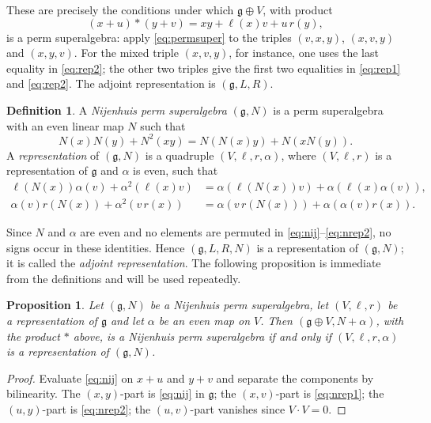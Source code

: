 \documentclass[11pt]{article}
\newtheorem{proposition}[theorem]{Proposition}
\theoremstyle{definition}
\newtheorem{definition}[theorem]{Definition}
\newcommand{\g}{\mathfrak{g}}
\begin{document}
These are precisely the conditions under which $\g\oplus V$, with product
\[
(x+u)*(y+v)=xy+\ell(x)v+u\,r(y),
\]
is a perm superalgebra: apply \eqref{eq:permsuper} to the triples $(v,x,y)$, $(x,v,y)$ and $(x,y,v)$. For the mixed triple $(x,v,y)$, for instance, one uses the last equality in \eqref{eq:rep2}; the other two triples give the first two equalities in \eqref{eq:rep1} and \eqref{eq:rep2}. The adjoint representation is $(\g,L,R)$.

\begin{definition}\label{def:nijenhuis}
A \emph{Nijenhuis perm superalgebra} $(\g,N)$ is a perm superalgebra with an even linear map $N$ such that
\begin{equation}\label{eq:nij}
N(x)N(y)+N^2(xy)=N(N(x)y)+N(xN(y)).
\end{equation}
A \emph{representation} of $(\g,N)$ is a quadruple $(V,\ell,r,\alpha)$, where $(V,\ell,r)$ is a representation of $\g$ and $\alpha$ is even, such that
\begin{align}
\ell(N(x))\alpha(v)+\alpha^2(\ell(x)v)
&=\alpha(\ell(N(x))v)+\alpha(\ell(x)\alpha(v)),\label{eq:nrep1}\\
\alpha(v)r(N(x))+\alpha^2(v\,r(x))
&=\alpha(v\,r(N(x)))+\alpha(\alpha(v)r(x)).\label{eq:nrep2}
\end{align}
\end{definition}

Since $N$ and $\alpha$ are even and no elements are permuted in \eqref{eq:nij}--\eqref{eq:nrep2}, no signs occur in these identities. Hence $(\g,L,R,N)$ is a representation of $(\g,N)$; it is called the \emph{adjoint representation}. The following proposition is immediate from the definitions and will be used repeatedly.

\begin{proposition}\label{prop:semi}
Let $(\g,N)$ be a Nijenhuis perm superalgebra, let $(V,\ell,r)$ be a representation of $\g$ and let $\alpha$ be an even map on $V$. Then $(\g\oplus V,N+\alpha)$, with the product $*$ above, is a Nijenhuis perm superalgebra if and only if $(V,\ell,r,\alpha)$ is a representation of $(\g,N)$.
\end{proposition}
\begin{proof}
Evaluate \eqref{eq:nij} on $x+u$ and $y+v$ and separate the components by bilinearity. The $(x,y)$-part is \eqref{eq:nij} in $\g$; the $(x,v)$-part is \eqref{eq:nrep1}; the $(u,y)$-part is \eqref{eq:nrep2}; the $(u,v)$-part vanishes since $V\cdot V=0$.
\end{proof}
\end{document}
